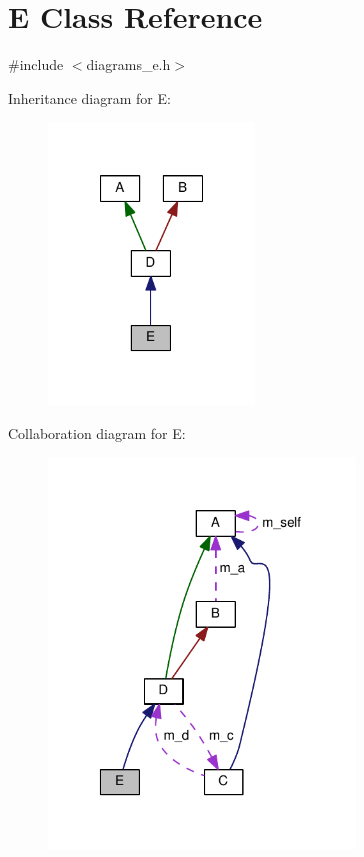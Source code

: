 \section{E Class Reference}
\label{class_e}


{\ttfamily \#include $<$diagrams\-\_\-e.\-h$>$}



Inheritance diagram for E\-:\nopagebreak
\begin{figure}[H]
\begin{center}
\leavevmode
\includegraphics[width=155pt]{class_e__inherit__graph}
\end{center}
\end{figure}


Collaboration diagram for E\-:\nopagebreak
\begin{figure}[H]
\begin{center}
\leavevmode
\includegraphics[width=231pt]{class_e__coll__graph}
\end{center}
\end{figure}
